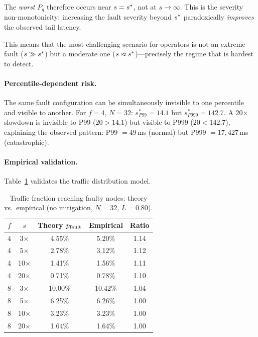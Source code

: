 The \emph{worst} $P_q$ therefore occurs near $s = s^{*}$, not at
$s \to \infty$. This is the severity non-monotonicity: increasing the
fault severity beyond $s^{*}$ paradoxically \emph{improves} the
observed tail latency.

This means that the most challenging scenario for operators is not
an extreme fault ($s \gg s^{*}$) but a moderate one
($s \approx s^{*}$)---precisely the regime that is hardest to detect.

\paragraph{Percentile-dependent risk.}
The same fault configuration can be simultaneously invisible to one
percentile and visible to another. For $f = 4$, $N = 32$:
$s^{*}_{P99} = 14.1$ but $s^{*}_{P999} = 142.7$. A 20$\times$
slowdown is invisible to P99 ($20 > 14.1$) but visible to P999
($20 < 142.7$), explaining the observed pattern: P99 $= 49$\,ms
(normal) but P999 $= 17{,}427$\,ms (catastrophic).

\paragraph{Empirical validation.}
Table~\ref{tab:pfault} validates the traffic distribution model.

\begin{table}[t]
\centering
\caption{Traffic fraction reaching faulty nodes: theory vs.\ empirical
  (no mitigation, $N=32$, $L=0.80$).}
\label{tab:pfault}
\begin{tabular}{@{}ccccc@{}}
\toprule
$f$ & $s$ & Theory $p_{\text{fault}}$ & Empirical & Ratio \\
\midrule
4 & 3$\times$ & 4.55\% & 5.20\% & 1.14 \\
4 & 5$\times$ & 2.78\% & 3.12\% & 1.12 \\
4 & 10$\times$ & 1.41\% & 1.56\% & 1.11 \\
4 & 20$\times$ & 0.71\% & 0.78\% & 1.10 \\
\midrule
8 & 3$\times$ & 10.00\% & 10.42\% & 1.04 \\
8 & 5$\times$ & 6.25\% & 6.26\% & 1.00 \\
8 & 10$\times$ & 3.23\% & 3.23\% & 1.00 \\
8 & 20$\times$ & 1.64\% & 1.64\% & 1.00 \\
\bottomrule
\end{tabular}
\end{table}

